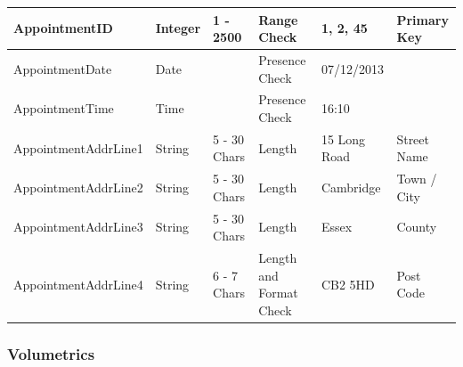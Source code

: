 \begin{flushleft}
\begin{longtable}{|p{3.6cm}|p{1.5cm}|p{2cm}|p{2cm}|p{2cm}|p{2cm}|}
AppointmentID & Integer & 1 - 2500 & Range Check & 1, 2, 45 & Primary Key \\ \hline
AppointmentDate & Date & & Presence Check  & 07/12/2013  & \\ \hline
AppointmentTime & Time &  & Presence Check  & 16:10 & \\ \hline
AppointmentAddrLine1 & String & 5 - 30 Chars & Length & 15 Long Road & Street Name \\ \hline
AppointmentAddrLine2 & String & 5 - 30 Chars & Length & Cambridge & Town / City \\ \hline
AppointmentAddrLine3 & String & 5 - 30 Chars & Length & Essex & County \\ \hline
AppointmentAddrLine4 & String & 6 - 7 Chars & Length and Format Check & CB2 5HD & Post Code \\ \hline

\end{longtable}
\end{flushleft}


\subsubsection{Volumetrics}

